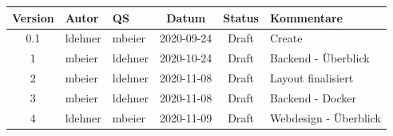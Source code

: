 \documentclass[minted, notitle]{protocol}
\begin{document}
\begin{center}

\begin{tabular}{| c | p{1.8cm} | p{1.8cm} | c | c | p{3.4cm} |}
\hline \rowcolor{gray} \textbf{\color{white}Version} & \textbf{\color{white}Autor} & \textbf{\color{white}QS} & \textbf{\color{white}Datum} & \textbf{\color{white}Status} & \textbf{\color{white}Kommentare} \\ 
 \hline \hline
0.1 & ldehner & mbeier  & 2020-09-24 & Draft & Create \\ \hline 
1   & mbeier  & ldehner & 2020-10-24 & Draft & Backend - Überblick \\ \hline
2   & mbeier  & ldehner & 2020-11-08 & Draft & Layout finalisiert \\ \hline
3   & mbeier  & ldehner & 2020-11-08 & Draft & Backend - Docker \\ \hline
4   & ldehner  & mbeier & 2020-11-09 & Draft & Webdesign - Überblick \\ \hline

\end{tabular}
\end{center}

\clearpage
{
  \hypersetup{linkcolor=black}
  \tableofcontents
} 
\clearpage




\end{document}

